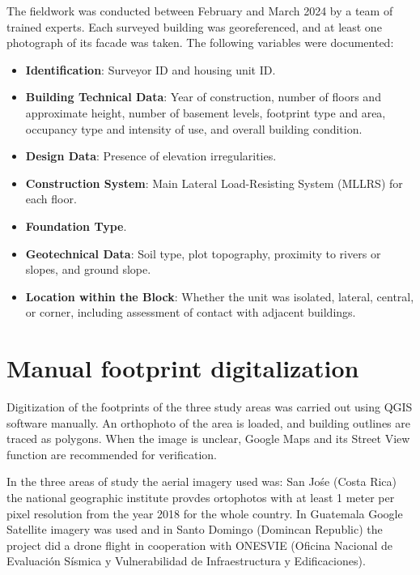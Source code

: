 The fieldwork was conducted between February and March 2024 by a team of trained experts. Each surveyed building was georeferenced, and at least one photograph of its facade was taken. The following variables were documented:

\begin{itemize}
    \item \textbf{Identification}: Surveyor ID and housing unit ID.
    \item \textbf{Building Technical Data}: Year of construction, number of floors and approximate height, number of basement levels, footprint type and area, occupancy type and intensity of use, and overall building condition.
    \item \textbf{Design Data}: Presence of elevation irregularities.
    \item \textbf{Construction System}: Main Lateral Load-Resisting System (MLLRS) for each floor.
    \item \textbf{Foundation Type}.
    \item \textbf{Geotechnical Data}: Soil type, plot topography, proximity to rivers or slopes, and ground slope.
    \item \textbf{Location within the Block}: Whether the unit was isolated, lateral, central, or corner, including assessment of contact with adjacent buildings.
\end{itemize}


\renewcommand{\sectionnametext}{Manual footprint digitalization}
\renewcommand{\headingtextR}{\thesection. \sectionnametext}
\section{\sectionnametext}

\label{sec:manual_footprint}

Digitization of the footprints of the three study areas was carried out using QGIS software manually. An orthophoto of the area is loaded, and building outlines are traced as polygons. When the image is unclear, Google Maps and its Street View function are recommended for verification.


In the three areas of study the aerial imagery used was: San Jośe (Costa Rica) the national geographic institute provdes ortophotos with at least 1 meter per pixel resolution from the year 2018 for the whole country. In Guatemala Google Satellite imagery was used and in Santo Domingo (Domincan Republic) the project did a drone flight in cooperation with ONESVIE (Oficina Nacional de Evaluación Sísmica y Vulnerabilidad de Infraestructura y Edificaciones).


